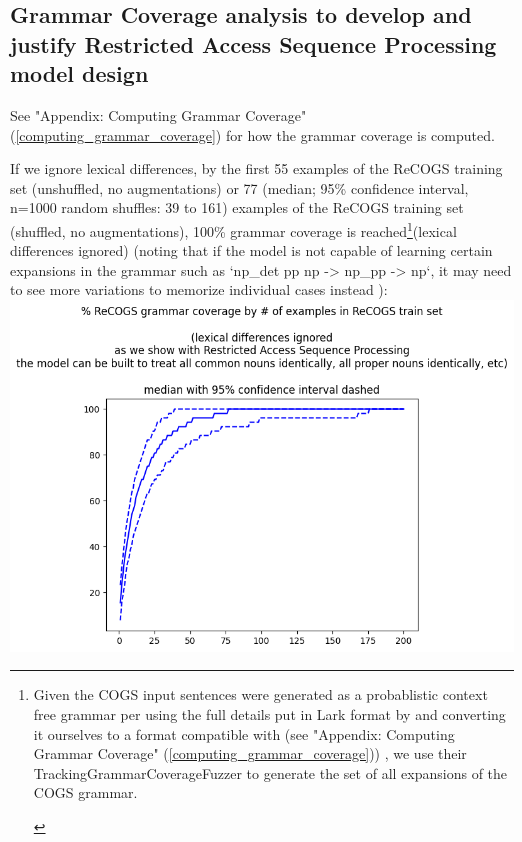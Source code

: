 \documentclass[11pt]{article}
\begin{document}
\subsection{Grammar Coverage analysis to develop and justify Restricted Access Sequence Processing model design}
\label{grammar_coverage_analysis_for_model_design}

See "Appendix: Computing Grammar Coverage" (\ref{computing_grammar_coverage}) for how the grammar coverage is computed.

If we ignore lexical differences, by the first 55 examples of the ReCOGS training set (unshuffled, no augmentations) or 77 (median; 95\% confidence interval, n=1000 random shuffles: 39 to 161) examples of the ReCOGS training set (shuffled, no augmentations), 100\% grammar coverage is reached\footnote{\begin{footnotesize}Given the COGS input sentences were generated as a probablistic context free grammar per \cite{KimLinzen2020}
using the full details put in Lark format by \cite{klinger2024compositionalprogramgenerationfewshot}
and converting it ourselves to a format compatible with \cite{fuzzingbook2023:GrammarCoverageFuzzer} (see "Appendix: Computing Grammar Coverage" (\ref{computing_grammar_coverage})) , we use their TrackingGrammarCoverageFuzzer to generate the set of all expansions of the COGS grammar.
\end{footnotesize}
}(lexical differences ignored) \cite{fuzzingbook2023:GrammarCoverageFuzzer} (noting that if the model is not capable of learning certain expansions in the grammar such as `np\_det pp np -> np\_pp -> np`, it may need to see more variations to memorize individual cases instead ):
\includegraphics[scale=0.38]{grammar_coverage_by_number_of_recogs_training_examples_lexical_differences_ignored.png}
\end{document}
